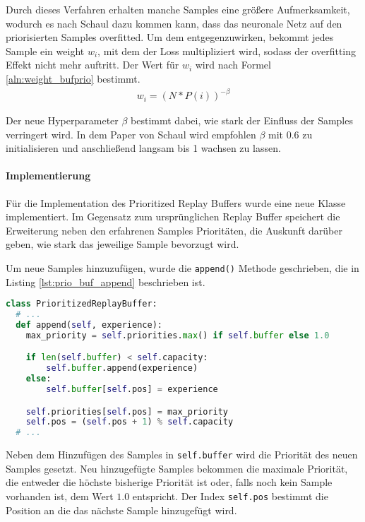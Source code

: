 \documentclass[11pt]{scrartcl}
\begin{document}
Durch dieses Verfahren erhalten manche Samples eine größere Aufmerksamkeit, wodurch es
nach Schaul \cite{schaul2015prioritized} dazu kommen kann, dass das neuronale Netz auf den
priorisierten Samples overfitted. Um dem entgegenzuwirken, bekommt jedes Sample ein
weight $w_i$, mit dem der Loss multipliziert wird, sodass der overfitting Effekt nicht
mehr auftritt. Der Wert für $w_i$ wird nach Formel \ref{aln:weight_bufprio} bestimmt.
\begin{align}
  w_i = \left(N * P(i)\right)^{-\beta}
\label{aln:weight_bufprio}
\end{align}

Der neue Hyperparameter $\beta$ bestimmt dabei, wie stark der Einfluss der Samples
verringert wird. In dem Paper von Schaul wird empfohlen $\beta$ mit 0.6 zu initialisieren
und anschließend langsam bis 1 wachsen zu lassen.

\paragraph*{Implementierung}
\noindent
\newline
Für die Implementation des Prioritized Replay Buffers wurde eine neue Klasse
implementiert. Im Gegensatz zum ursprünglichen Replay Buffer speichert die Erweiterung
neben den erfahrenen Samples Prioritäten, die Auskunft darüber geben, wie stark das
jeweilige Sample bevorzugt wird.

Um neue Samples hinzuzufügen, wurde die \lstinline!append()! Methode geschrieben, die in
Listing \ref{lst:prio_buf_append} beschrieben ist.
\begin{lstlisting}[language=Python, caption=append()-Funktion des PrioritizedReplayBuffers,
label=lst:prio_buf_append]
class PrioritizedReplayBuffer:
  # ...
  def append(self, experience):
    max_priority = self.priorities.max() if self.buffer else 1.0

    if len(self.buffer) < self.capacity:
        self.buffer.append(experience)
    else:
        self.buffer[self.pos] = experience

    self.priorities[self.pos] = max_priority
    self.pos = (self.pos + 1) % self.capacity
  # ...
\end{lstlisting}
\noindent
Neben dem Hinzufügen des Samples in \lstinline!self.buffer! wird die Priorität des neuen
Samples gesetzt. Neu hinzugefügte Samples bekommen die maximale Priorität, die entweder
die höchste bisherige Priorität ist oder, falls noch kein Sample vorhanden ist, dem Wert
$1.0$ entspricht. Der Index \lstinline!self.pos! bestimmt die Position an die das nächste
Sample hinzugefügt wird.
\end{document}
